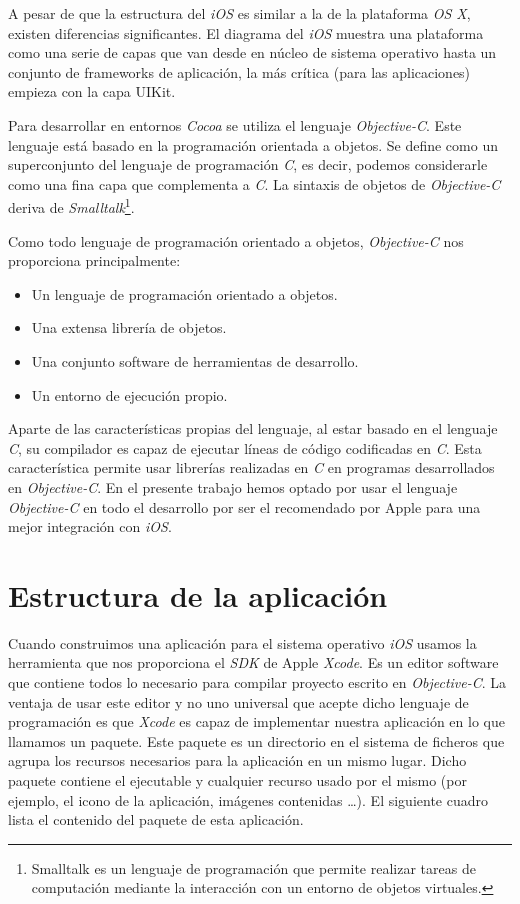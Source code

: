  A pesar de que la estructura del \emph{iOS} es similar a la de la plataforma \emph{OS X}, existen diferencias significantes. El diagrama del \emph{iOS} muestra una plataforma como una serie de capas que van desde en núcleo de sistema operativo hasta un conjunto de frameworks de aplicación, la más crítica (para las aplicaciones) empieza con la capa UIKit.
 
 Para desarrollar en entornos \emph{Cocoa} se utiliza el lenguaje \emph{Objective-C}. Este lenguaje está basado en la programación orientada a objetos. Se define como un superconjunto del lenguaje de programación \emph{C}, es decir, podemos considerarle como una fina capa que complementa a \emph{C}. La sintaxis de objetos de \emph{Objective-C} deriva de \emph{Smalltalk}\footnote{Smalltalk es un lenguaje de programación que permite realizar tareas de computación mediante la interacción con un entorno de objetos virtuales.}.
 
  Como todo lenguaje de programación orientado a objetos, \emph{Objective-C} nos proporciona principalmente:
 \begin{itemize}
	\item Un lenguaje de programación orientado a objetos.
	\item Una extensa librería de objetos.
	\item Una conjunto software de herramientas de desarrollo.
	\item Un entorno de ejecución propio.
\end{itemize}

 Aparte de las características propias del lenguaje, al estar basado en el lenguaje \emph{C}, su compilador es capaz de ejecutar líneas de código codificadas en \emph{C}. Esta característica permite usar librerías realizadas en \emph{C} en programas desarrollados en \emph{Objective-C}.  En el presente trabajo hemos optado por usar el lenguaje \emph{Objective-C} en todo el desarrollo por ser el recomendado por Apple para una mejor integración con \emph{iOS}.
 
\section{Estructura de la aplicación}
 Cuando construimos una aplicación para el sistema operativo \emph{iOS} usamos la herramienta que nos proporciona el \emph{SDK} de Apple \emph{Xcode}. Es un editor software que contiene todos lo necesario para compilar proyecto escrito en \emph{Objective-C}. La ventaja de usar este editor y no uno universal que acepte dicho lenguaje de programación es que \emph{Xcode} es capaz de implementar nuestra aplicación en lo que llamamos un paquete. Este paquete es un directorio en el sistema de ficheros que agrupa los recursos necesarios para la aplicación en un mismo lugar. Dicho paquete contiene el ejecutable y cualquier recurso usado por el mismo (por ejemplo, el icono de la aplicación, imágenes contenidas \ldots). El siguiente cuadro lista el contenido del paquete de esta aplicación.
 
